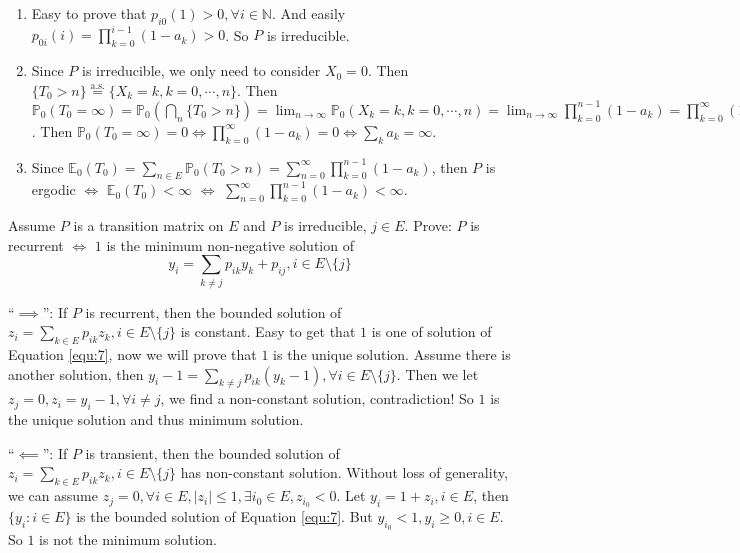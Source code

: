\documentclass[../main]{subfiles}
\begin{document}
\begin{solution}
  \begin{enumerate}
    \item Easy to prove that \(p_{i0}(1)>0,\forall i \in \mathbb{N}\).
      And easily \(p_{0i}(i)=\prod_{k=0}^{i-1} (1-a_k)>0\).
      So \(P\) is irreducible.
    \item Since \(P\) is irreducible, we only need to consider \(X_0=0\). Then \(\{T_0 > n\} \overset{\text{a.s.}}{=}\{X_k=k,k=0,\cdots,n\}\).
      Then \(\mathbb{P}_0(T_0 = \infty)=\mathbb{P}_0(\bigcap_{n}\{T_0 > n\})=\lim_{n \to \infty}\mathbb{P}_0(X_k=k,k=0,\cdots,n)=\lim_{n \to \infty}\prod_{k=0}^{n-1} (1-a_k) =\prod_{k=0}^{\infty} (1-a_k) \).
      Then \(\mathbb{P}_0(T_0=\infty)=0 \iff \prod_{k=0}^{\infty} (1-a_k) =0\iff \sum_{k}a_k=\infty\).
    \item Since \(\mathbb{E}_0(T_0)=\sum_{n \in E}\mathbb{P}_0(T_0 >n)=\sum_{n=0}^{\infty} \prod_{k=0}^{n-1} (1-a_k)\), then \(P\) is ergodic
      \(\iff \) \(\mathbb{E}_0(T_0) < \infty\) \(\iff\) \(\sum_{n=0}^{\infty} \prod_{k=0}^{n-1} (1-a_k) <\infty\).
  \end{enumerate}
\end{solution}
\begin{problem}\label{pro:7}
  Assume \(P\) is a transition matrix on \(E\) and \(P\) is irreducible, \(j \in E\).
  Prove: \(P\) is recurrent \(\iff\) \(1\) is the minimum non-negative solution of
  \begin{equation}\label{equ:7}
    y_i = \sum_{k \neq j} p_{ik}y_k + p_{ij}, i \in E\setminus\{j\}
  \end{equation}
\end{problem}
\begin{solution}
  ``\(\implies\)'': If \(P\) is recurrent, then the bounded solution of \(z_i=\sum_{k \in E}p_{ik}z_k, i  \in E\setminus\{j\}\) is constant.
  Easy to get that \(1\) is one of solution of Equation \eqref{equ:7}, now we will prove that \(1\) is the unique solution.
  Assume there is another solution, then \(y_i-1=\sum_{k \neq j}p_{ik}(y_k-1),\forall i \in E\setminus\{j\}\).
  Then we let \(z_j=0,z_i=y_i-1,\forall i \neq j\), we find a non-constant solution, contradiction!
  So \(1\) is the unique solution and thus minimum solution.

  ``\(\impliedby\)'': If \(P\) is transient, then the bounded solution of \(z_i=\sum_{k \in E}p_{ik}z_k, i  \in E\setminus\{j\}\) has non-constant solution.
  Without loss of generality, we can assume \(z_j=0,\forall i \in E,|z_i| \leq 1,  \exists i_0 \in E, z_{i_0} <0\).
  Let \(y_i = 1 + z_i, i \in E\), then \(\{y_i: i \in E\}\) is the bounded solution of Equation \eqref{equ:7}.
  But \(y_{i_0} <1, y_i \geq 0, i \in E\).
  So \(1\) is not the minimum solution.
\end{solution}
\end{document}
